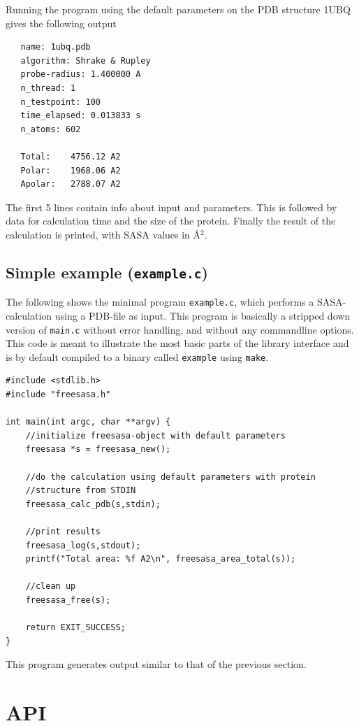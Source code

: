 \documentclass[a4paper,11pt]{article}
\begin{document}
Running the program using the default parameters on the PDB structure
1UBQ gives the following output
\begin{verbatim}
   name: 1ubq.pdb
   algorithm: Shrake & Rupley
   probe-radius: 1.400000 A
   n_thread: 1
   n_testpoint: 100
   time_elapsed: 0.013833 s
   n_atoms: 602
   
   Total:    4756.12 A2
   Polar:    1968.06 A2
   Apolar:   2788.07 A2
\end{verbatim}
The first 5 lines contain info about input and parameters. This is
followed by data for calculation time and the size of the
protein. Finally the result of the calculation is printed, with SASA
values in Å$^2$.

\subsection{Simple example (\texttt{example.c})}\label{sec:simple_sample}

The following shows the minimal program \verb|example.c|, which
performs a SASA-calculation using a PDB-file as input. This program is
basically a stripped down version of \verb|main.c| without error
handling, and without any commandline options. This code is meant to
illustrate the most basic parts of the library interface and is by
default compiled to a binary called \verb|example| using \verb|make|.

\begin{verbatim}
#include <stdlib.h>
#include "freesasa.h"

int main(int argc, char **argv) { 
    //initialize freesasa-object with default parameters
    freesasa *s = freesasa_new();

    //do the calculation using default parameters with protein
    //structure from STDIN
    freesasa_calc_pdb(s,stdin);

    //print results
    freesasa_log(s,stdout);
    printf("Total area: %f A2\n", freesasa_area_total(s));

    //clean up
    freesasa_free(s);

    return EXIT_SUCCESS;
}
\end{verbatim}
This program generates output similar to that of the previous
section.

\section{API} \label{sec:using}
\end{document}
